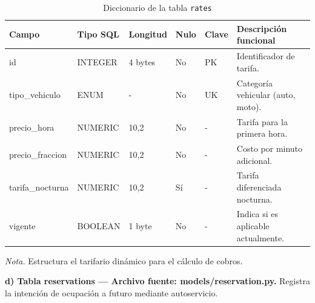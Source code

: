 \begin{table}[htbp]
\caption{Diccionario de la tabla \texttt{rates}}
\label{tab:dict_rates}
\begin{tabular}{@{}p{4cm} p{3cm} p{1.5cm} p{1cm} p{1.5cm} p{4cm}@{}}
\toprule
\textbf{Campo} & \textbf{Tipo SQL} & \textbf{Longitud} & \textbf{Nulo} & \textbf{Clave} & \textbf{Descripción funcional} \\
\midrule
id & INTEGER & 4 bytes & No & PK & Identificador de tarifa. \\
tipo\_vehiculo & ENUM & - & No & UK & Categoría vehicular (auto, moto). \\
precio\_hora & NUMERIC & 10,2 & No & - & Tarifa para la primera hora. \\
precio\_fraccion & NUMERIC & 10,2 & No & - & Costo por minuto adicional. \\
tarifa\_nocturna & NUMERIC & 10,2 & Sí & - & Tarifa diferenciada nocturna. \\
vigente & BOOLEAN & 1 byte & No & - & Indica si es aplicable actualmente. \\
\bottomrule
\end{tabular}
\par\vspace{0.2cm}
\textit{Nota.} Estructura el tarifario dinámico para el cálculo de cobros.
\end{table}

\newpage\textbf{d) Tabla reservations — Archivo fuente: models/reservation.py.} Registra la intención de ocupación a futuro mediante autoservicio.


